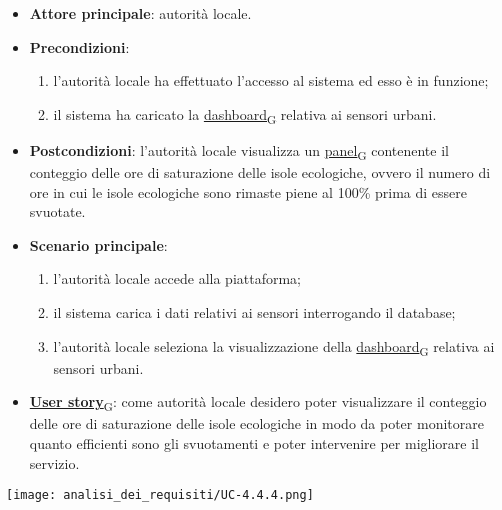 \newpage
{}
\begin{itemize}
	\item \textbf{Attore principale}: autorità locale.
	\item \textbf{Precondizioni}:
	      \begin{enumerate}
		      \item l'autorità locale ha effettuato l'accesso al sistema ed esso è in funzione;
		      \item il sistema ha caricato la \href{https://7last.github.io/docs/pb/documentazione-interna/glossario\#dashboard}{dashboard\textsubscript{G}} relativa ai sensori urbani.
	      \end{enumerate}
	\item \textbf{Postcondizioni}: l'autorità locale visualizza un \href{https://7last.github.io/docs/pb/documentazione-interna/glossario\#panel}{panel\textsubscript{G}} contenente il conteggio delle ore di saturazione delle isole ecologiche,
	      ovvero il numero di ore in cui le isole ecologiche sono rimaste piene al 100\% prima di essere svuotate.
	\item \textbf{Scenario principale}:
	      \begin{enumerate}
		      \item l'autorità locale accede alla piattaforma;
		      \item il sistema carica i dati relativi ai sensori interrogando il database;
		      \item l'autorità locale seleziona la visualizzazione della \href{https://7last.github.io/docs/pb/documentazione-interna/glossario\#dashboard}{dashboard\textsubscript{G}} relativa ai sensori urbani.
	      \end{enumerate}
	\item \href{https://7last.github.io/docs/pb/documentazione-interna/glossario\#user-story}{\textbf{User story}\textsubscript{G}}:
	      come autorità locale desidero poter visualizzare il conteggio delle ore di saturazione delle isole ecologiche in modo da poter monitorare
	      quanto efficienti sono gli svuotamenti e poter intervenire per migliorare il servizio.
\end{itemize}
\begin{center}
	\texttt{[image: analisi\_dei\_requisiti/UC-4.4.4.png]}
\end{center}

